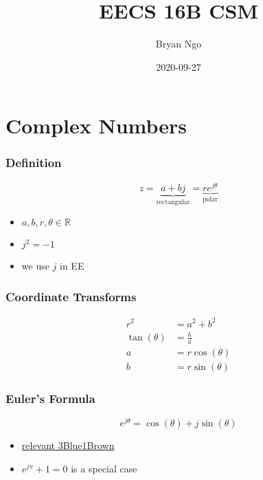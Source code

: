 \documentclass[aspectratio=169]{beamer}
\title{EECS 16B CSM}
\author{Bryan Ngo}
\date{2020-09-27}
\institute{Computer Science Mentors}
\newcommand{\R}{\mathbb{R}}
\begin{document}
\begin{frame}
    \maketitle
\end{frame}

\begin{frame}
    \tableofcontents
\end{frame}

\section{Complex Numbers}

\begin{frame}
    \frametitle{Definition}

    \begin{equation}
        z = \underbrace{a + bj}_{\text{rectangular}} = \underbrace{r e^{j \theta}}_{\text{polar}}
    \end{equation}
    \begin{itemize}
        \item \(a, b, r, \theta \in \R\)
        \item \(j^2 = -1\)
        \item we use \(j\) in EE
    \end{itemize}
\end{frame}

\begin{frame}
    \frametitle{Coordinate Transforms}

    \begin{align}
        r^2 &= a^2 + b^2 \\
        \tan(\theta) &= \frac{b}{a} \\
        a &= r \cos(\theta) \\
        b &= r \sin(\theta)
    \end{align}
\end{frame}

\begin{frame}
    \frametitle{Euler's Formula}

    \begin{equation}
        e^{j \theta} = \cos(\theta) + j \sin(\theta)
    \end{equation}
    \begin{itemize}
        \item \href{https://youtu.be/v0YEaeIClKY}{relevant 3Blue1Brown}
        \item \(e^{j \pi} + 1 = 0\) is a special case
    \end{itemize}
\end{frame}
\end{document}
